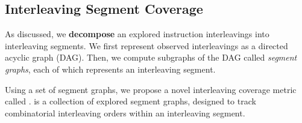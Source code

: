 % 



\subsection{Interleaving Segment Coverage}
\label{ss:coverage}

As discussed, we \textbf{decompose} an explored instruction interleavings
into interleaving segments.
%
We first represent observed interleavings as a directed acyclic graph
(DAG). Then, we compute subgraphs of the DAG called \textit{segment
  graphs}, each of which represents an interleaving segment.



Using a set of segment graphs, we propose a novel interleaving
coverage metric called \textit{\intcov}.
%
\Intcov is a collection of explored segment graphs, designed to track
combinatorial interleaving orders within an interleaving segment.




